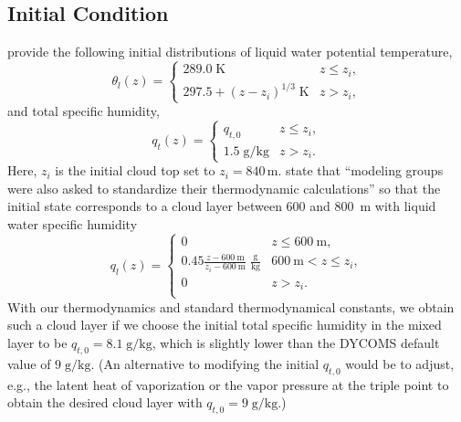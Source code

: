 \documentclass{report}
\begin{document}
{\subsection{Initial Condition}

\cite{Stevens05a} provide the following initial distributions of liquid water potential temperature,
\begin{equation}\label{eq:dycoms1}
\theta_l(z) = 
    \begin{cases}
    289.0\;\mathrm{K} & z\leq z_i,\\
    297.5 + (z - z_i)^{1/3}\;\mathrm{K}& z > z_i,
    \end{cases}
\end{equation}
and total specific humidity, 
\begin{equation}\label{eq:dycoms2}
q_t(z) = 
    \begin{cases}
    q_{t,0} & z\leq z_i,\\
    1.5\;\mathrm{g/kg} & z > z_i.
    \end{cases}
\end{equation}
Here, $z_i$ is the initial cloud top set to $z_i=840\,\mathrm{m}$. \cite{Stevens05a} state that ``modeling groups were also asked to standardize their thermodynamic calculations'' so that the initial state corresponds to a cloud layer between 600 and 800~m with liquid water specific humidity
\begin{equation}\label{eq:dycoms3}
q_l(z) = 
    \begin{cases}
    0 & z\leq 600~\mathrm{m},\\
    0.45\frac{{}z - 600~\mathrm{m}}{z_i - 600~\mathrm{m}}\;\mathrm{\frac{g}{kg}}   & 600~\mathrm{m} < z \leq z_i,\\
    0 & z > z_i.\\
    \end{cases}
\end{equation}
With our thermodynamics and standard thermodynamical constants, we obtain such a cloud layer if we choose the initial total specific humidity in the mixed layer to be $q_{t,0} = 8.1\;\mathrm{g/kg}$, which is slightly lower than the DYCOMS default value of $9\;\mathrm{g/kg}$. (An alternative to modifying the initial $q_{t,0}$ would be to adjust, e.g., the latent heat of vaporization or the vapor pressure at the triple point to obtain the desired cloud layer with $q_{t,0} = 9\;\mathrm{g/kg}$.)

}
\end{document}
